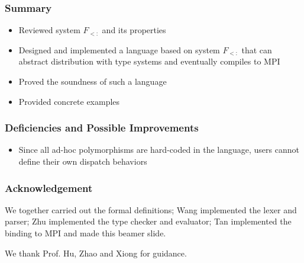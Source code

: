 \documentclass{beamer}
\begin{document}
\begin{frame}
    \frametitle{Summary}
  
    \begin{itemize}
      \item Reviewed system $F_{<:}$ and its properties
      \item Designed and implemented a language based on system $F_{<:}$ that can abstract distribution with type systems and eventually compiles to MPI
      \item Proved the soundness of such a language
      \item Provided concrete examples
    \end{itemize}

\end{frame}

\begin{frame}
    \frametitle{Deficiencies and Possible Improvements}
  
    \begin{itemize}
      \item Since all ad-hoc polymorphisms are hard-coded in the language, users cannot define their own dispatch behaviors
    \end{itemize}

\end{frame}

\begin{frame}
\frametitle{Acknowledgement}

We together carried out the formal definitions; Wang implemented the lexer and parser; Zhu implemented the type checker and evaluator; Tan implemented the binding to MPI and made this beamer slide.

We thank Prof. Hu, Zhao and Xiong for guidance.

\end{frame}
\end{document}
